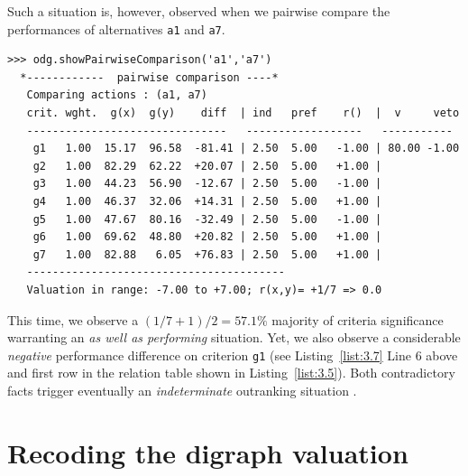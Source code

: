 Such a situation is, however, observed when we pairwise compare the performances of alternatives \texttt{a1} and \texttt{a7}.
\begin{lstlisting}[caption={Pairwiese comparison with considerable performance difference},label=list:3.7,basicstyle=\scriptsize]
>>> odg.showPairwiseComparison('a1','a7')
  *------------  pairwise comparison ----*
   Comparing actions : (a1, a7)
   crit. wght.  g(x)  g(y)    diff  | ind   pref    r()  |  v     veto
   -------------------------------   ------------------   -----------
    g1   1.00  15.17  96.58  -81.41 | 2.50  5.00   -1.00 | 80.00 -1.00
    g2   1.00  82.29  62.22  +20.07 | 2.50  5.00   +1.00 | 
    g3   1.00  44.23  56.90  -12.67 | 2.50  5.00   -1.00 | 
    g4   1.00  46.37  32.06  +14.31 | 2.50  5.00   +1.00 | 
    g5   1.00  47.67  80.16  -32.49 | 2.50  5.00   -1.00 | 
    g6   1.00  69.62  48.80  +20.82 | 2.50  5.00   +1.00 | 
    g7   1.00  82.88   6.05  +76.83 | 2.50  5.00   +1.00 | 
   ----------------------------------------
   Valuation in range: -7.00 to +7.00; r(x,y)= +1/7 => 0.0
\end{lstlisting}
This time, we observe a $(1/7 + 1)/2 = 57.1\%$ majority of criteria significance warranting an \emph{as well as performing} situation. Yet, we also observe a considerable \emph{negative} performance difference on criterion \texttt{g1} (see Listing~\ref{list:3.7} Line 6 above and first row in the relation table shown in Listing~\ref{list:3.5}). Both contradictory facts trigger eventually an \emph{indeterminate} outranking situation \citep{BIS-2013}. 

\section{Recoding the digraph valuation}
\label{sec:3.4}

